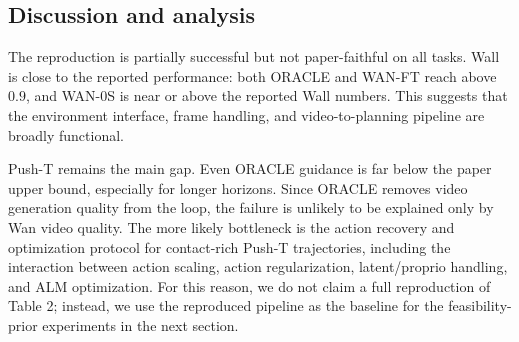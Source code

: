 \subsection{Discussion and analysis}
The reproduction is partially successful but not paper-faithful on all tasks.
Wall is close to the reported performance: both ORACLE and WAN-FT reach above
\(0.9\), and WAN-0S is near or above the reported Wall numbers. This suggests
that the environment interface, frame handling, and video-to-planning pipeline
are broadly functional.

Push-T remains the main gap. Even ORACLE guidance is far below the paper
upper bound, especially for longer horizons. Since ORACLE removes video
generation quality from the loop, the failure is unlikely to be explained only
by Wan video quality. The more likely bottleneck is the action recovery and
optimization protocol for contact-rich Push-T trajectories, including the
interaction between action scaling, action regularization, latent/proprio
handling, and ALM optimization. For this reason, we do not claim a full
reproduction of Table 2; instead, we use the reproduced pipeline as the baseline
for the feasibility-prior experiments in the next section.
